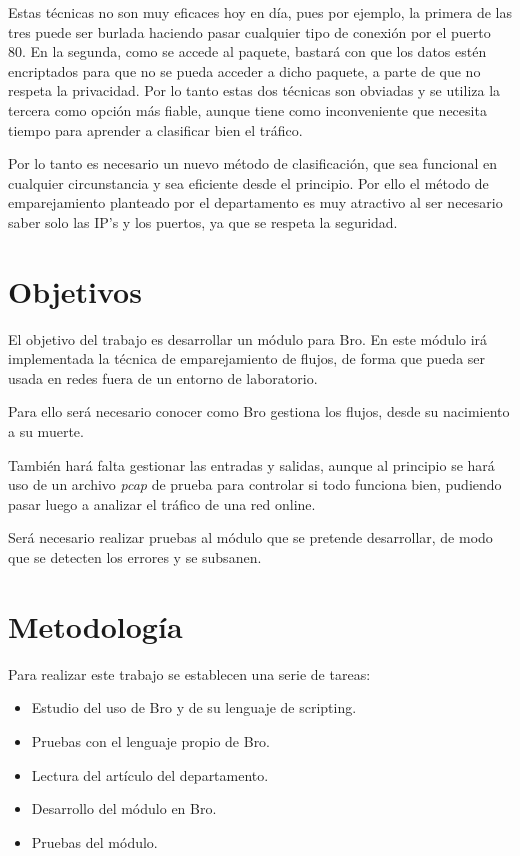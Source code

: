 Estas técnicas no son muy eficaces hoy en día, pues por ejemplo, la primera de las tres puede ser burlada 
haciendo pasar cualquier tipo de conexión por el puerto 80. En la segunda, como se accede al paquete, bastará con que los datos estén 
encriptados para que no se pueda acceder a dicho paquete, a parte de que no respeta la privacidad. Por lo tanto estas 
dos técnicas son obviadas y se utiliza la tercera como opción más fiable, aunque tiene como inconveniente que 
necesita tiempo para aprender a clasificar bien el tráfico.

\intro Por lo tanto es necesario un nuevo método de clasificación, que sea funcional en cualquier circunstancia 
y sea eficiente desde el principio. Por ello el método de emparejamiento planteado por el departamento es 
muy atractivo al ser necesario saber solo las IP's y los puertos, ya que se respeta la seguridad. \cite{comparacion}

\section{Objetivos}

El objetivo del trabajo es desarrollar un módulo para Bro. En este módulo irá implementada la 
técnica de emparejamiento de flujos, de forma que pueda ser usada en redes fuera de un entorno de laboratorio.

\intro Para ello será necesario conocer como Bro gestiona los flujos, desde su nacimiento a su muerte. 

\intro También hará falta gestionar las entradas y salidas, aunque al principio se hará uso de un 
archivo \textit{pcap} de prueba para controlar si todo funciona bien, 
pudiendo pasar luego a analizar el tráfico de una red online.

\intro Será necesario realizar pruebas al módulo que se pretende desarrollar, de modo que se detecten los 
errores y se subsanen.

\section{Metodología}

Para realizar este trabajo se establecen una serie de tareas:

\begin{itemize}
\item Estudio del uso de Bro y de su lenguaje de scripting.
\item Pruebas con el lenguaje propio de Bro.
\item Lectura del artículo del departamento. \cite{comparacion}
\item Desarrollo del módulo en Bro.
\item Pruebas del módulo.
\end{itemize}

